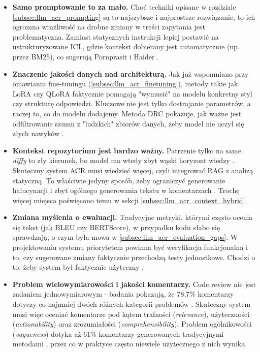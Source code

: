 \begin{itemize}
    \item \textbf{Samo promptowanie to za mało.} Choć techniki opisane w rozdziale \ref{subsec:llm_acr_prompting} 
są to najszybsze i najprostsze rozwiązanie, to ich ogromna wrażliwość 
na drobne zmiany w treści zapytania jest problematyczna. Zamiast statycznych instrukcji 
lepiej postawić na ustrukturyzowane ICL, gdzie kontekst dobierany jest automatycznie (np. przez BM25), co 
sugerują Pornprasit i Haider \cite{Pornprasit2024FineTuningPromptingCR, Haider2024PromptingFineTuningRCG}.
    
    \item \textbf{Znaczenie jakości danych nad architekturą.} Jak już wspomniano przy omawianiu fine-tuningu 
(\ref{subsec:llm_acr_finetuning}), metody takie jak LoRA czy QLoRA faktycznie pomagają "wymusić" na modelu konkretny styl 
czy strukturę odpowiedzi. Kluczowe nie jest tylko dostrajanie parametrów, a raczej to, co 
do modelu dodajemy. Metoda DRC pokazuje, jak ważne jest odfiltrowanie szumu z "ludzkich" zbiorów 
danych, żeby model nie uczył się złych nawyków \cite{Yu2025Desiview, Yu2024Carllm}.
    
    \item \textbf{Kontekst repozytorium jest bardzo ważny.} Patrzenie tylko na 
same \emph{diffy} to zły kierunek, bo model ma wtedy zbyt wąski horyzont wiedzy \cite{Tufano2024CodeReviewAutomation}. 
Skuteczny system ACR musi wiedzieć więcej, czyli integrować RAG z analizą statyczną. 
To właściwie jedyny sposób, żeby ograniczyć generowanie halucynacji i zbyt ogólnego generowania tekstu w komentarzach \cite{Jaoua2025LLMStaticAnalyzersCR, 
Icoz2025SymbolicReasoning}. Trochę więcej miejsca poświęcono temu w sekcji \ref{subsec:llm_acr_context_hybrid}.
    
    \item \textbf{Zmiana myślenia o ewaluacji.} Tradycyjne metryki, którymi często ocenia się tekst 
(jak BLEU czy BERTScore), w przypadku kodu słabo się sprawdzają, o czym była mowa 
w \ref{subsec:llm_acr_evaluation_gaps}. W projektowaniu systemu priorytetem powinna być weryfikacja funkcjonalna i to, czy 
sugerowane zmiany faktycznie przechodzą testy jednostkowe. Chodzi o to, żeby system był faktycznie użyteczny \cite{Cihan2025EvaluatingLLMsForCodeReview, Lin2025CodeReviewQA}.
    
    \item \textbf{Problem wielowymiarowości i jakości komentarzy.} Code review nie jest
zadaniem jednowymiarowym - badania pokazują, że 78,7\% komentarzy dotyczy co najmniej
dwóch różnych kategorii problemów \cite{Li2025CodeDoctor}. Skuteczny system musi więc
oceniać komentarze pod kątem trafności (\emph{relevance}), użyteczności
(\emph{actionability}) oraz zrozumiałości (\emph{comprehensibility}). Problem ogólnikowości
(\emph{vagueness}) dotyka aż 61\% komentarzy generowanych tradycyjnymi metodami
\cite{Ren2025HydraReviewer}, przez co w praktyce często niewiele użytecznego z nich wynika.


\end{itemize}
